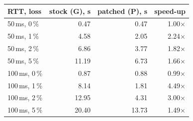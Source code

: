 \begin{tabular}{@{}lrrr@{}}
\toprule
RTT, loss & stock (G), s & patched (P), s & speed-up \\
\midrule
50\,ms, 0\,\% & 0.47 & 0.47 & 1.00$\times$ \\
50\,ms, 1\,\% & 4.58 & 2.05 & 2.24$\times$ \\
50\,ms, 2\,\% & 6.86 & 3.77 & 1.82$\times$ \\
50\,ms, 5\,\% & 11.19 & 6.73 & 1.66$\times$ \\
100\,ms, 0\,\% & 0.87 & 0.88 & 0.99$\times$ \\
100\,ms, 1\,\% & 8.14 & 1.81 & 4.49$\times$ \\
100\,ms, 2\,\% & 12.95 & 4.31 & 3.00$\times$ \\
100\,ms, 5\,\% & 20.40 & 13.73 & 1.49$\times$ \\
\bottomrule
\end{tabular}
